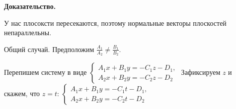 \documentclass[a4paper]{article}
\begin{document}
\begin{hproof}
\textbf{Доказательство.} 

У нас плосоксти пересекаются, поэтому нормальные векторы плоскостей непараллельны.

Общий случай. Предположим $\displaystyle \frac{A_1}{A_2} \neq \frac{B_1}{B_2}$.
 
 Перепишем систему в виде $\begin{cases}
 A_1x+B_1y=-C_1z-D_1,
 \\
 A_2x+B_2y=-C_2z-D_2
 \end{cases}
$ Зафиксируем $z$ и скажем, что $z=t$: $\displaystyle \begin{cases}
 A_1x+B_1y=-C_1t-D_1,
 \\
 A_2x+B_2y=-C_2t-D_2
 \end{cases}
$


\end{hproof}
\end{document}
